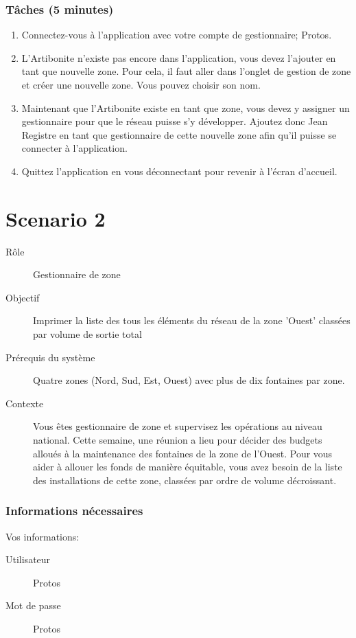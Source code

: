 \documentclass[a4paper, 11pt]{article}
\begin{document}
    \subsubsection*{Tâches (5 minutes)}
        \begin{enumerate}
            \item Connectez-vous à l'application avec votre compte de gestionnaire; Protos.
            \item L’Artibonite n’existe pas encore dans l'application, vous devez l’ajouter en tant que nouvelle zone. Pour cela, il faut aller dans l’onglet de gestion de zone et créer une nouvelle zone. Vous pouvez choisir son nom.
            \item Maintenant que l’Artibonite existe en tant que zone, vous devez y assigner un gestionnaire pour que le réseau puisse s’y développer. Ajoutez donc Jean Registre en tant que gestionnaire de cette nouvelle zone afin qu’il puisse se connecter à l’application.
            \item Quittez l’application en vous déconnectant pour revenir à l’écran d’accueil.
        \end{enumerate}
\newpage

\section*{Scenario 2}
    \begin{description}
        \item[Rôle] Gestionnaire de zone
        \item[Objectif] Imprimer la liste des tous les éléments du réseau de la zone 'Ouest' classées par volume de sortie total
        \item[Prérequis du système] Quatre zones (Nord, Sud, Est, Ouest) avec plus de dix fontaines par zone.
        \item[Contexte] Vous êtes gestionnaire de zone et supervisez les opérations au niveau national. Cette semaine, une réunion a lieu pour décider des budgets alloués à la maintenance des fontaines de la zone de l'Ouest. Pour vous aider à allouer les fonds de manière équitable, vous avez besoin de la liste des installations de cette zone, classées par ordre de volume décroissant.
    \end{description}

    \subsubsection*{Informations nécessaires}
        Vos informations:
        \begin{description}
            \item[Utilisateur] Protos
            \item[Mot de passe] Protos
        \end{description}
\end{document}
